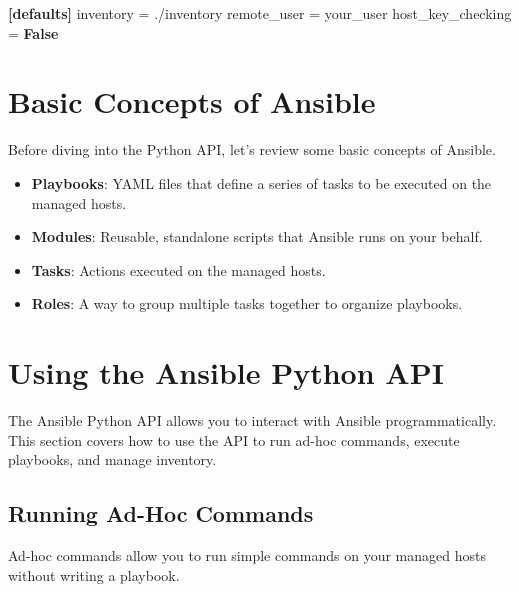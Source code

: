 \documentclass[
  letterpaper,
  DIV=11,
  numbers=noendperiod]{scrreprt}
\newenvironment{Shaded}{\begin{snugshade}}{\end{snugshade}}
\newcommand{\DataTypeTok}[1]{\textcolor[rgb]{0.68,0.00,0.00}{#1}}
\newcommand{\KeywordTok}[1]{\textcolor[rgb]{0.00,0.23,0.31}{\textbf{#1}}}
\newcommand{\OtherTok}[1]{\textcolor[rgb]{0.00,0.23,0.31}{#1}}
\newcommand{\StringTok}[1]{\textcolor[rgb]{0.13,0.47,0.30}{#1}}
\providecommand{\tightlist}{%
  \setlength{\itemsep}{0pt}\setlength{\parskip}{0pt}}\usepackage{longtable,booktabs,array}
\begin{document}
\begin{Shaded}
\begin{Highlighting}[]
\KeywordTok{[defaults]}
\DataTypeTok{inventory }\OtherTok{=}\StringTok{ ./inventory}
\DataTypeTok{remote\_user }\OtherTok{=}\StringTok{ your\_user}
\DataTypeTok{host\_key\_checking }\OtherTok{=}\StringTok{ }\KeywordTok{False}
\end{Highlighting}
\end{Shaded}

\section{Basic Concepts of Ansible}\label{basic-concepts-of-ansible}

Before diving into the Python API, let's review some basic concepts of
Ansible.

\begin{itemize}
\tightlist
\item
  \textbf{Playbooks}: YAML files that define a series of tasks to be
  executed on the managed hosts.
\item
  \textbf{Modules}: Reusable, standalone scripts that Ansible runs on
  your behalf.
\item
  \textbf{Tasks}: Actions executed on the managed hosts.
\item
  \textbf{Roles}: A way to group multiple tasks together to organize
  playbooks.
\end{itemize}

\section{Using the Ansible Python
API}\label{using-the-ansible-python-api}

The Ansible Python API allows you to interact with Ansible
programmatically. This section covers how to use the API to run ad-hoc
commands, execute playbooks, and manage inventory.

\subsection{Running Ad-Hoc Commands}\label{running-ad-hoc-commands}

Ad-hoc commands allow you to run simple commands on your managed hosts
without writing a playbook.
\end{document}
